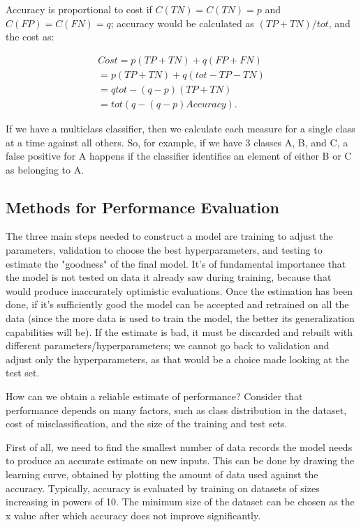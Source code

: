 Accuracy is proportional to cost if $C(TN) = C(TN) = p$ and $C(FP) = C(FN) = q$; accuracy would be calculated as $(TP + TN)/tot$, and the cost as:

\begin{align*}
    Cost = p(TP + TN) + q(FP + FN) \\
    = p(TP + TN) + q(tot - TP - TN) \\
    = qtot - (q - p)(TP + TN) \\
    = tot(q - (q-p)Accuracy).
\end{align*}

If we have a multiclass classifier, then we calculate each measure for a single class at a time against all others. So, for example, if we have 3 classes A, B, and C, a false positive for A happens if the classifier identifies an element of either B or C as belonging to A.

\subsection{Methods for Performance Evaluation}

The three main steps needed to construct a model are training to adjust the parameters, validation to choose the best hyperparameters, and testing to estimate the "goodness" of the final model. It's of fundamental importance that the model is not tested on data it already saw during training, because that would produce inaccurately optimistic evaluations. Once the estimation has been done, if it's sufficiently good the model can be accepted and retrained on all the data (since the more data is used to train the model, the better its generalization capabilities will be). If the estimate is bad, it must be discarded and rebuilt with different parameters/hyperparameters; we cannot go back to validation and adjust only the hyperparameters, as that would be a choice made looking at the test set.

How can we obtain a reliable estimate of performance? Consider that performance depends on many factors, such as class distribution in the dataset, cost of misclassification, and the size of the training and test sets.

First of all, we need to find the smallest number of data records the model needs to produce an accurate estimate on new inputs. This can be done by drawing the learning curve, obtained by plotting the amount of data used against the accuracy. Typically, accuracy is evaluated by training on datasets of sizes increasing in powers of 10. The minimum size of the dataset can be chosen as the x value after which accuracy does not improve significantly.

